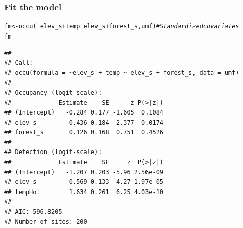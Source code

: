 \documentclass[color=usenames,dvipsnames]{beamer}\usepackage[]{graphicx}\usepackage[]{xcolor}
\makeatletter
\newcommand{\hlcom}[1]{\textcolor[rgb]{0.514,0.506,0.514}{\textit{#1}}}%
\newcommand{\hlopt}[1]{\textcolor[rgb]{0,0,0}{#1}}%
\newcommand{\hldef}[1]{\textcolor[rgb]{0,0,0}{#1}}%
\newcommand{\hlkwb}[1]{\textcolor[rgb]{0,0.341,0.682}{#1}}%
\newcommand{\hlkwd}[1]{\textcolor[rgb]{0.004,0.004,0.506}{#1}}%
\newenvironment{kframe}{%
 \def\at@end@of@kframe{}%
 \ifinner\ifhmode%
  \def\at@end@of@kframe{\end{minipage}}%
  \begin{minipage}{\columnwidth}%
 \fi\fi%
 \def\FrameCommand##1{\hskip\@totalleftmargin \hskip-\fboxsep
 \colorbox{shadecolor}{##1}\hskip-\fboxsep
     \hskip-\linewidth \hskip-\@totalleftmargin \hskip\columnwidth}%
 \MakeFramed {\advance\hsize-\width
   \@totalleftmargin\z@ \linewidth\hsize
   \@setminipage}}%
 {\par\unskip\endMakeFramed%
 \at@end@of@kframe}
\newenvironment{knitrout}{}{} %
\makeatother
\begin{document}
\begin{frame}[fragile]
  \frametitle{Fit the model}
  \footnotesize
\begin{knitrout}\scriptsize
{}\color{fgcolor}\begin{kframe}
\begin{alltt}
\hldef{fm} \hlkwb{<-} \hlkwd{occu}\hldef{(}\hlopt{~}\hldef{elev_s}\hlopt{+}\hldef{temp} \hlopt{~}\hldef{elev_s}\hlopt{+}\hldef{forest_s, umf)} \hlcom{# Standardized covariates}
\hldef{fm}
\end{alltt}
\begin{verbatim}
## 
## Call:
## occu(formula = ~elev_s + temp ~ elev_s + forest_s, data = umf)
## 
## Occupancy (logit-scale):
##             Estimate    SE      z P(>|z|)
## (Intercept)   -0.284 0.177 -1.605  0.1084
## elev_s        -0.436 0.184 -2.377  0.0174
## forest_s       0.126 0.168  0.751  0.4526
## 
## Detection (logit-scale):
##             Estimate    SE     z  P(>|z|)
## (Intercept)   -1.207 0.203 -5.96 2.56e-09
## elev_s         0.569 0.133  4.27 1.97e-05
## tempHot        1.634 0.261  6.25 4.03e-10
## 
## AIC: 596.8205 
## Number of sites: 200
\end{verbatim}
\end{kframe}
\end{knitrout}
\end{frame}
\end{document}
